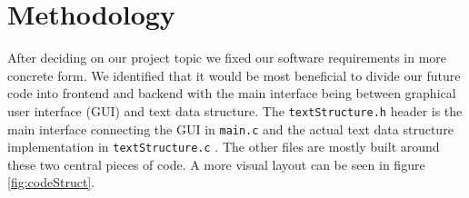 \section{Methodology}\label{sec:meto}
After deciding on our project topic we fixed our software requirements in more concrete form. We identified that it would be most beneficial to divide our future code into frontend and backend with the main interface being between graphical user interface (GUI) and text data structure. The \verb|textStructure.h| header is the main interface connecting the GUI in \verb|main.c| and the actual text data structure implementation in \verb|textStructure.c| \cite{GithubRepo}. The other files are mostly built around these two central pieces of code. A more visual layout can be seen in figure \ref{fig:codeStruct}.
